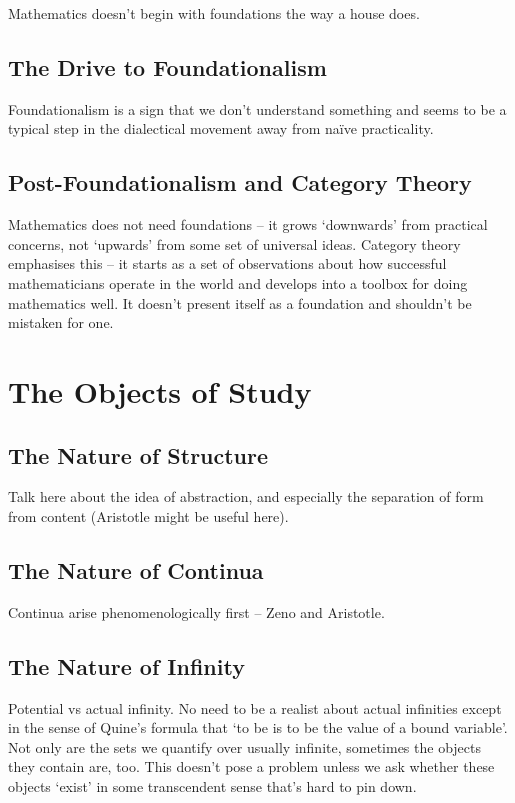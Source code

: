\documentclass[oneside,english]{amsbook}
\numberwithin{section}{chapter}
\theoremstyle{plain}
\theoremstyle{definition}
\begin{document}
Mathematics doesn't begin with foundations the way a house does.

\section{The Drive to Foundationalism}

Foundationalism is a sign that we don't understand something and seems to be a typical step in the dialectical movement away from na\"ive practicality.

\section{Post-Foundationalism and Category Theory}

Mathematics does not need foundations -- it grows `downwards' from practical concerns, not `upwards' from some set of universal ideas. Category theory emphasises this -- it starts as a set of observations about how successful mathematicians operate in the world and develops into a toolbox for doing mathematics well. It doesn't present itself as a foundation and shouldn't be mistaken for one. 




\chapter{The Objects of Study}

\section{The Nature of Structure}

Talk here about the idea of abstraction, and especially the separation of form from content (Aristotle might be useful here).

\section{The Nature of Continua}

Continua arise phenomenologically first -- Zeno and Aristotle. 

\section{The Nature of Infinity}

Potential vs actual infinity. No need to be a realist about actual infinities except in the sense of Quine's formula that `to be is to be the value of a bound variable'. Not only are the sets we quantify over usually infinite, sometimes the objects they contain are, too. This doesn't pose a problem unless we ask whether these objects `exist' in some transcendent sense that's hard to pin down.
\end{document}
